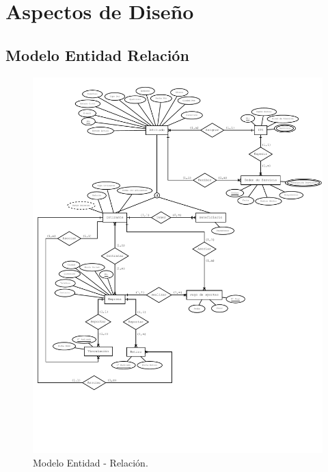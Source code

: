 \documentclass[12pt,a4paper]{article}
\begin{document}
\section{Aspectos de Diseño}
\subsection{Modelo Entidad Relación}
\begin{figure}[H]
\centering
{\includegraphics[width=1\textwidth]{Entity_relationship_diagram.pdf} \par}
\caption{Modelo Entidad - Relación.}
\end{figure}
\end{document}

